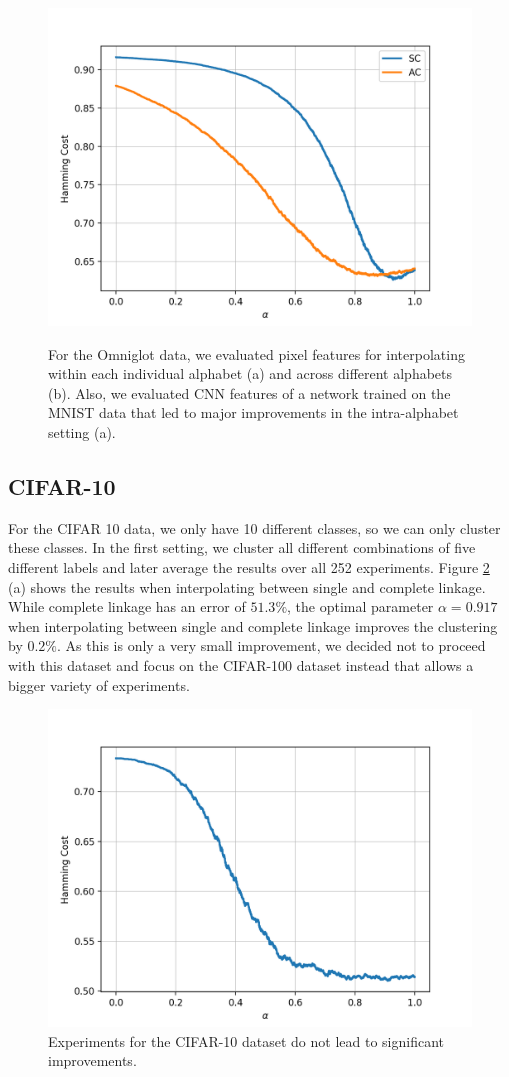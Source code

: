 \begin{figure}[H]
\begin{minipage}{.45\textwidth}
  {\includegraphics[width=\linewidth]{plots/omniglot_inter}}
\end{minipage}
\caption{For the Omniglot data, we evaluated pixel features for interpolating within each individual alphabet (a) and across different alphabets (b). Also, we evaluated CNN features of a network trained on the MNIST data that led to major improvements in the intra-alphabet setting (a).}
\label{fig:omniglot_overview}
\end{figure}

\subsection{CIFAR-10}

For the CIFAR 10 data, we only have 10 different classes, so we can only cluster these classes. In the first setting, we cluster all different combinations of five different labels and later average the results over all 252 experiments. Figure \ref{fig:cifar10res} (a) shows the results when interpolating between single and complete linkage. While complete linkage has an error of $51.3\%$, the optimal parameter $\alpha = 0.917$ when interpolating between single and complete linkage improves the clustering by $0.2\%$. As this is only a very small improvement, we decided not to proceed with this dataset and focus on the CIFAR-100 dataset instead that allows a bigger variety of experiments.

\begin{figure}[H]
  \centering
  \includegraphics[width=.6\textwidth]{plots/cifar10_sc}
  \caption{Experiments for the CIFAR-10 dataset do not lead to significant improvements.}
  \label{fig:cifar10res}
\end{figure}

